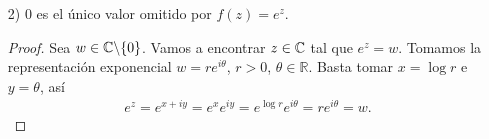 \begin{enumerate}
\begin{proof}
\begin{align*}
\begin{array}{lcc}
                                                            \end{array}
                  \right. \Longleftrightarrow \left\{ \begin{array}{lcc}
                                                          e^x(-1)^k = 1                \\
                                                          y = k\pi, \ k \in \mathbb{Z} \\
                                                      \end{array}
                  \right. \Longleftrightarrow \left\{ \begin{array}{lcc}
                                                          e^x \cdot 1 = 1                               \\
                                                          y = k\pi, \ k \in \mathbb{Z}, \ k \text{ par} \\
                                                      \end{array}
                  \right.                                                                                                   \\
                              & \Longleftrightarrow \left\{ \begin{array}{lcc}
                                                                x  = 0                       \\
                                                                y = k\pi, \ k \in \mathbb{Z} \\
                                                            \end{array}
                  \right. \Longleftrightarrow z - w = 2k\pi i, \ k \in \mathbb{Z}
              \end{align*}
          \end{proof}
          \begin{obs}
              Esto nos dice que $f(z) = e^z$ es inyectiva en cualquier banda horizontal de altura $2\pi$, es decir, del tipo
              \begin{align*}
                  S_{y_0} = \{ x + iy \in \com : y \in [y_0, y_0 + 2\pi) \}.
              \end{align*}
          \end{obs}
    \item[2)] $0$ es el único valor omitido por $f(z) = e^z$.
          \begin{proof}
              Sea $w \in \mathbb{C} \backslash \{0\}$. Vamos a encontrar $z \in \mathbb{C}$ tal que $e^z = w$. Tomamos la representación exponencial $w = re^{i\theta}$, $r>0$, $\theta \in \mathbb{R}$. Basta tomar $x = \log r$ e $y = \theta$, así
              \begin{align*}
                  e^z = e^{x + iy} = e^xe^{iy} = e^{\log r}e^{i\theta} = re^{i\theta} = w.
              \end{align*}
          \end{proof}
\end{enumerate}

